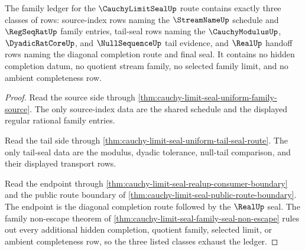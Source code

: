 \begin{theorem}
\label{thm:cauchy-limit-seal-family-ledger-exhaustion}
The family ledger for the $\CauchyLimitSealUp$ route contains exactly three classes of rows: source-index rows naming the $\StreamNameUp$ schedule and $\RegSeqRatUp$ family entries, tail-seal rows naming the $\CauchyModulusUp$, $\DyadicRatCoreUp$, and $\NullSequenceUp$ tail evidence, and $\RealUp$ handoff rows naming the diagonal completion route and final seal. It contains no hidden completion datum, no quotient stream family, no selected family limit, and no ambient completeness row.
\end{theorem}
\begin{proof}
Read the source side through \autoref{thm:cauchy-limit-seal-uniform-family-source}. The only source-index data are the shared schedule and the displayed regular rational family entries.

Read the tail side through \autoref{thm:cauchy-limit-seal-uniform-tail-seal-route}. The only tail-seal data are the modulus, dyadic tolerance, null-tail comparison, and their displayed transport rows.

Read the endpoint through \autoref{thm:cauchy-limit-seal-realup-consumer-boundary} and the public route boundary of \autoref{thm:cauchy-limit-seal-public-route-boundary}. The endpoint is the diagonal completion route followed by the $\RealUp$ seal. The family non-escape theorem of \autoref{thm:cauchy-limit-seal-family-seal-non-escape} rules out every additional hidden completion, quotient family, selected limit, or ambient completeness row, so the three listed classes exhaust the ledger.
\end{proof}

